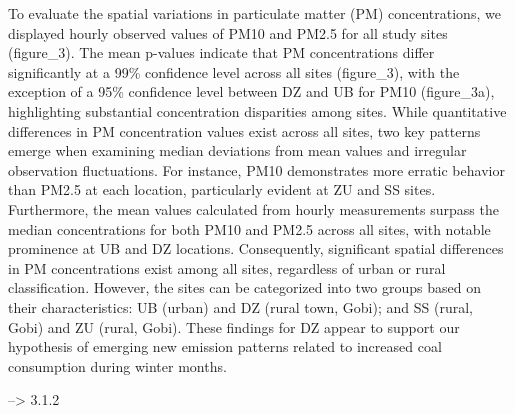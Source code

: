 \documentclass[
  11pt,
]{article}
\begin{document}
To evaluate the spatial variations in particulate matter (PM)
concentrations, we displayed hourly observed values of PM10 and PM2.5
for all study sites (figure\_3). The mean p-values indicate that PM
concentrations differ significantly at a 99\% confidence level across
all sites (figure\_3), with the exception of a 95\% confidence level
between DZ and UB for PM10 (figure\_3a), highlighting substantial
concentration disparities among sites. While quantitative differences in
PM concentration values exist across all sites, two key patterns emerge
when examining median deviations from mean values and irregular
observation fluctuations. For instance, PM10 demonstrates more erratic
behavior than PM2.5 at each location, particularly evident at ZU and SS
sites. Furthermore, the mean values calculated from hourly measurements
surpass the median concentrations for both PM10 and PM2.5 across all
sites, with notable prominence at UB and DZ locations. Consequently,
significant spatial differences in PM concentrations exist among all
sites, regardless of urban or rural classification. However, the sites
can be categorized into two groups based on their characteristics: UB
(urban) and DZ (rural town, Gobi); and SS (rural, Gobi) and ZU (rural,
Gobi). These findings for DZ appear to support our hypothesis of
emerging new emission patterns related to increased coal consumption
during winter months.

--\textgreater{} 3.1.2
\end{document}
